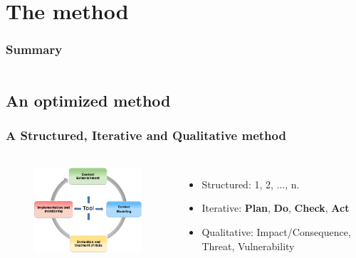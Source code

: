 
%
%
\section{The method}
\begin{frame}
    \frametitle{Summary}
    \begin{columns}[t]
        \begin{column}{5cm}
            \tableofcontents[sections={1-3}, currentsection, hideothersubsections]
        \end{column}
        \begin{column}{5cm}
            \tableofcontents[sections={4-5}, currentsection, hideothersubsections]
        \end{column}
    \end{columns}
\end{frame}


\subsection{An optimized method}
\begin{frame}
    \frametitle{A Structured, Iterative and Qualitative method}
    \framesubtitle{}
    \begin{columns}[t]
        \column{6.0cm}
        \begin{figure}
        \includegraphics[width=6.0cm]{./images/MONARC-method-1.png}
        \end{figure}
        \column{6cm}
        \begin{itemize}
                \item Structured: 1, 2, ..., n.
                \item Iterative: \textbf{Plan}, \textbf{Do}, \textbf{Check}, \textbf{Act}
                \item Qualitative: Impact/Consequence, Threat, Vulnerability
        \end{itemize}
        \end{columns}
\end{frame}


